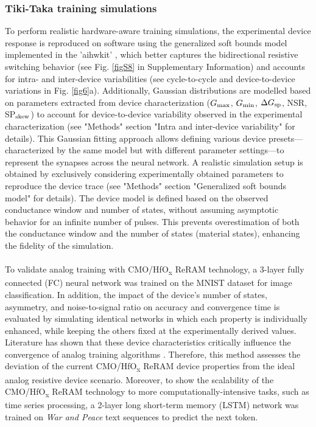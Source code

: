 \subsubsection{Tiki-Taka training simulations}\label{subsubsecTT}
To perform realistic hardware-aware training simulations, the experimental device response is reproduced on software using the generalized soft bounds model implemented in the 'aihwkit' \cite{Frascaroli2018}, which better captures the bidirectional resistive switching behavior (see Fig. \ref{figS8} in Supplementary Information) and accounts for intra- and inter-device variabilities (see cycle-to-cycle and device-to-device variations in Fig. \ref{fig6}a). Additionally, Gaussian distributions are modelled based on parameters extracted from device characterization ($G_{\rm max}$, $G_{\rm min}$, $\Delta G_{\rm sp}$, NSR, SP$_{\rm skew}$) to account for device-to-device variability observed in the experimental characterization (see "Methods" section "Intra and inter-device variability" for details). This Gaussian fitting approach allows defining various device presets—characterized by the same model but with different parameter settings—to represent the synapses across the neural network. A realistic simulation setup is obtained by exclusively considering experimentally obtained parameters to reproduce the device trace (see "Methods" section "Generalized soft bounds model" for details). The device model is defined based on the observed conductance window and number of states, without assuming asymptotic behavior for an infinite number of pulses. This prevents overestimation of both the conductance window and the number of states (material states), enhancing the fidelity of the simulation.
\\
\\
To validate analog training with CMO/HfO\textsubscript{\textnormal{x}} ReRAM technology, a 3-layer fully connected (FC) neural network was trained on the MNIST dataset for image classification. In addition, the impact of the device's number of states, asymmetry, and noise-to-signal ratio on accuracy and convergence time is evaluated by simulating identical networks in which each property is individually enhanced, while keeping the others fixed at the experimentally derived values. Literature has shown that these device characteristics critically influence the convergence of analog training algorithms \cite{Rasch2024Agad}. Therefore, this method assesses the deviation of the current CMO/HfO\textsubscript{\textnormal{x}} ReRAM device properties from the ideal analog resistive device scenario. Moreover, to show the scalability of the CMO/HfO\textsubscript{\textnormal{x}} ReRAM technology to more computationally-intensive tasks, such as time series processing, a 2-layer long short-term memory (LSTM) network was trained on \textit{War and Peace} text sequences to predict the next token.  
